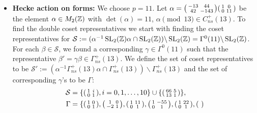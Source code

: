 \begin{itemize}
\item \textbf{Hecke action on forms: }  We choose $p=11$. Let $\alpha = \begin{psmallmatrix}
-13 & 44 \\ 42 & -143 
\end{psmallmatrix} \begin{psmallmatrix}
1 & 0 \\ 0 & 11
\end{psmallmatrix}$ be the element $\alpha \in M_2(\mathbb{Z})$ with $\det(\alpha) = 11$, $\alpha \pmod{13} \in C_{ns}^+(13).$ To find the double coset representatives we start with finding the coset representatives for $\mathcal{S} := (\alpha^{-1} \operatorname{SL}_2(\mathbb{Z}) \alpha \cap \operatorname{SL}_2(\mathbb{Z})) \backslash \operatorname{SL}_2(\mathbb{Z}) = \Gamma^0(11) \backslash \operatorname{SL}_2(\mathbb{Z})$. For each $\beta \in \mathcal{S}$, we found a corresponding $\gamma \in \Gamma^0(11)$ such that the representative $\beta' = \gamma \beta \in \Gamma_{ns}^+(13)$. We define the set of coset representatives to be $\mathcal{S}' := (\alpha^{-1} \Gamma_{ns}^+(13) \alpha \cap \Gamma_{ns}^+ (13)) \backslash \Gamma_{ns}^+(13)$ and the set of corresponding $\gamma$'s to be $\Gamma$: \begin{align*} 
\mathcal{S} &= \{ \begin{psmallmatrix}
1 & i \\ 0 & 1
\end{psmallmatrix} , i = 0,1, \ldots, 10 \} \cup \{ \begin{psmallmatrix}
66 & 5 \\ 13 & 1
\end{psmallmatrix}\}, \\
\Gamma &= \{ \begin{psmallmatrix}
1 & 0 \\ 0 & 1
\end{psmallmatrix},
\begin{psmallmatrix}
1 & 0 \\ -2 & 1
\end{psmallmatrix}, \begin{psmallmatrix}
1 & 11 \\ 0 & 1
\end{psmallmatrix}, \begin{psmallmatrix}
1 & -55 \\ 0 & 1
\end{psmallmatrix},\begin{psmallmatrix}
1 & 22 \\ 0 & 1
\end{psmallmatrix},\begin{psmallmatrix}

\end{psmallmatrix}
\end{align*}
\end{itemize}
